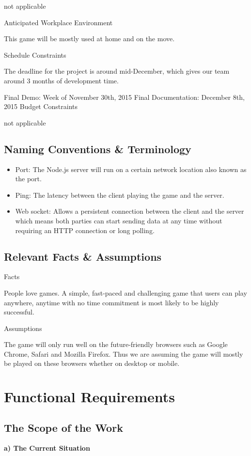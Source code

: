 \documentclass[12pt]{article}
\begin{document}
not applicable

Anticipated Workplace Environment

This game will be mostly used at home and on the move.

Schedule Constraints

The deadline for the project is around mid-December, which gives our team around 3 months of development time.

Final Demo: Week of November 30th, 2015 
Final Documentation: December 8th, 2015
Budget Constraints

not applicable
\subsection{Naming Conventions & Terminology}
\begin{itemize}
\item{Port: The Node.js server will run on a certain network location also known as the port.}
\item{Ping: The latency between the client playing the game and the server.}
\item{Web socket: Allows a persistent connection between the client and the server which means both parties can start sending data at any time without requiring an HTTP connection or long polling.}
\end{itemize}
\subsection{Relevant Facts & Assumptions}

Facts

People love games. A simple, fast-paced and challenging game that users can play anywhere, anytime with no time commitment is most likely to be highly successful.

Assumptions

The game will only run well on the future-friendly browsers such as Google Chrome, Safari and Mozilla Firefox. Thus we are assuming the game will mostly be played on these browsers whether on desktop or mobile.
\section{Functional Requirements}
\subsection{The Scope of the Work}
	\textbf{a) The Current Situation}
\end{document}
